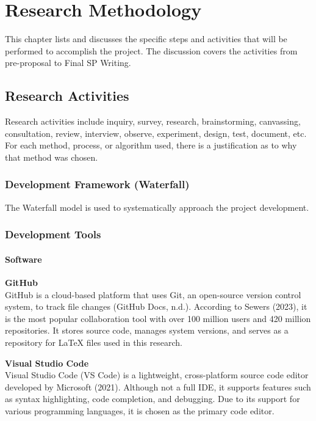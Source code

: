 \chapter{Research Methodology}
This chapter lists and discusses the specific steps and activities that will be performed to accomplish the project. 
The discussion covers the activities from pre-proposal to Final SP Writing.

\section{Research Activities}
Research activities include inquiry, survey, research, brainstorming, canvassing, consultation, review, interview, observe, experiment, design, test, document, etc.  
For each method, process, or algorithm used, there is a justification as to why that method was chosen.

\subsection{Development Framework (Waterfall)}
The Waterfall model is used to systematically approach the project development.

\subsection{Development Tools}
\subsubsection{Software}

\textbf{GitHub} \\
GitHub is a cloud-based platform that uses Git, an open-source version control system, to track file changes (GitHub Docs, n.d.). According to Sewers (2023), it is the most popular collaboration tool with over 100 million users and 420 million repositories. It stores source code, manages system versions, and serves as a repository for LaTeX files used in this research.

\textbf{Visual Studio Code} \\
Visual Studio Code (VS Code) is a lightweight, cross-platform source code editor developed by Microsoft (2021). Although not a full IDE, it supports features such as syntax highlighting, code completion, and debugging. Due to its support for various programming languages, it is chosen as the primary code editor.


